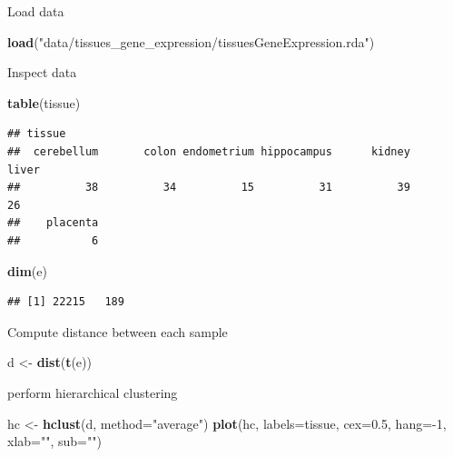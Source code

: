 \documentclass[]{book}
\newenvironment{Shaded}{\begin{snugshade}}{\end{snugshade}}
\newcommand{\KeywordTok}[1]{\textcolor[rgb]{0.13,0.29,0.53}{\textbf{{#1}}}}
\newcommand{\DataTypeTok}[1]{\textcolor[rgb]{0.13,0.29,0.53}{{#1}}}
\newcommand{\DecValTok}[1]{\textcolor[rgb]{0.00,0.00,0.81}{{#1}}}
\newcommand{\FloatTok}[1]{\textcolor[rgb]{0.00,0.00,0.81}{{#1}}}
\newcommand{\StringTok}[1]{\textcolor[rgb]{0.31,0.60,0.02}{{#1}}}
\newcommand{\NormalTok}[1]{{#1}}
\theoremstyle{definition}
\theoremstyle{definition}
\theoremstyle{definition}
\theoremstyle{remark}
\begin{document}
Load data

\begin{Shaded}
\begin{Highlighting}[]
\KeywordTok{load}\NormalTok{(}\StringTok{"data/tissues_gene_expression/tissuesGeneExpression.rda"}\NormalTok{)}
\end{Highlighting}
\end{Shaded}

Inspect data

\begin{Shaded}
\begin{Highlighting}[]
\KeywordTok{table}\NormalTok{(tissue)}
\end{Highlighting}
\end{Shaded}

\begin{verbatim}
## tissue
##  cerebellum       colon endometrium hippocampus      kidney       liver 
##          38          34          15          31          39          26 
##    placenta 
##           6
\end{verbatim}

\begin{Shaded}
\begin{Highlighting}[]
\KeywordTok{dim}\NormalTok{(e)}
\end{Highlighting}
\end{Shaded}

\begin{verbatim}
## [1] 22215   189
\end{verbatim}

Compute distance between each sample

\begin{Shaded}
\begin{Highlighting}[]
\NormalTok{d <-}\StringTok{ }\KeywordTok{dist}\NormalTok{(}\KeywordTok{t}\NormalTok{(e))}
\end{Highlighting}
\end{Shaded}

perform hierarchical clustering

\begin{Shaded}
\begin{Highlighting}[]
\NormalTok{hc <-}\StringTok{ }\KeywordTok{hclust}\NormalTok{(d, }\DataTypeTok{method=}\StringTok{"average"}\NormalTok{)}
\KeywordTok{plot}\NormalTok{(hc, }\DataTypeTok{labels=}\NormalTok{tissue, }\DataTypeTok{cex=}\FloatTok{0.5}\NormalTok{, }\DataTypeTok{hang=}\NormalTok{-}\DecValTok{1}\NormalTok{, }\DataTypeTok{xlab=}\StringTok{""}\NormalTok{, }\DataTypeTok{sub=}\StringTok{""}\NormalTok{)}
\end{Highlighting}
\end{Shaded}
\end{document}
